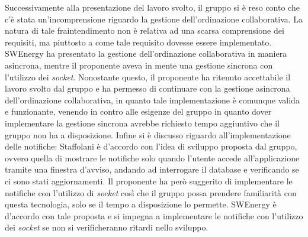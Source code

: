 Successivamente alla presentazione del lavoro svolto, il gruppo si è reso conto che c'è stata un'incomprensione riguardo la gestione dell'ordinazione collaborativa.
La natura di tale fraintendimento non è relativa ad una scarsa comprensione dei requisiti, ma piuttosto a come tale requisito dovesse essere implementato.
SWEnergy ha presentato la gestione dell'ordinazione collaborativa in maniera asincrona, mentre il proponente aveva in mente una gestione sincrona con l'utilizzo dei \textit{socket}.
Nonostante questo, il proponente ha ritenuto accettabile il lavoro svolto dal gruppo e ha permesso di continuare con la gestione asincrona dell'ordinazione collaborativa, in quanto tale implementazione è comunque valida e funzionante, venendo in contro alle esigenze del gruppo 
in quanto dover implementare la gestione sincrona avrebbe richiesto tempo aggiuntivo che il gruppo non ha a disposizione.
Infine si è discusso riguardo all'implementazione delle notifiche: Staffolani è d'accordo con l'idea di sviluppo proposta dal gruppo, ovvero quella di mostrare le notifiche 
solo quando l'utente accede all'applicazione tramite una finestra d'avviso, andando ad interrogare il database e verificando se ci sono stati aggiornamenti. Il proponente ha però 
suggerito di implementare le notifiche con l'utilizzo di \textit{socket} così che il gruppo possa prendere familiarità con questa tecnologia, solo se il tempo a disposizione lo permette.
SWEnergy è d'accordo con tale proposta e si impegna a implementare le notifiche con l'utilizzo dei \textit{socket} se non si verificheranno ritardi nello sviluppo.


